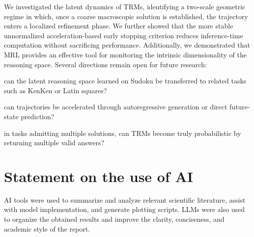\documentclass{article}
\begin{document}
We investigated the latent dynamics of TRMs, identifying a two-scale geometric regime in which, once a coarse macroscopic solution is established, the trajectory enters a localized refinement phase.
We further showed that the more stable unnormalized acceleration-based early stopping criterion reduces inference-time computation without sacrificing performance.
Additionally, we demonstrated that MRL provides an effective tool for monitoring the intrinsic dimensionality of the reasoning space.
Several directions remain open for future research:
\begin{enumerate*}[label=(\roman*)]
\item can the latent reasoning space learned on Sudoku be transferred to related tasks such as KenKen or Latin squares?
\item can trajectories be accelerated through autoregressive generation or direct future-state prediction?
\item in tasks admitting multiple solutions, can TRMs become truly probabilistic by returning multiple valid answers?
\end{enumerate*}


\section{Statement on the use of AI}

AI tools were used to summarize and analyze relevant scientific literature, assist with model implementation, and generate plotting scripts.
LLMs were also used to organize the obtained results and improve the clarity, conciseness, and academic style of the report.
\end{document}

